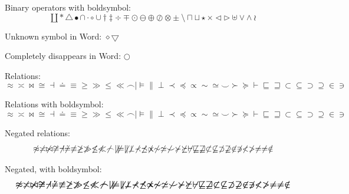 \documentclass[12pt,a4paper]{article}
\theoremstyle{clearprint}
\begin{document}
\noindent 
Binary operators with boldsymbol:
\begin{equation}
\boldsymbol{\amalg \ast \bigtriangleup \bullet \cap \cdot \circ \cup \dagger \ddagger \div \mp \odot \ominus \oplus \oslash \otimes \pm \setminus \sqcap \sqcup \star \times \triangleleft \triangleright \uplus \vee \wedge \wr}
\end{equation}

Unknown symbol in Word: $\boldsymbol{\diamond \bigtriangledown}$

Completely disappears in Word: $\boldsymbol{\bigcirc}$

\noindent 
Relations: %
\begin{equation}
\approx \asymp \bowtie \cong \dashv \doteq \equiv \geq \gg \leq \ll \frown \mid \models \parallel \perp \prec \preceq \propto \sim \simeq \smile \succ \succeq \vdash
\sqsubseteq \sqsupseteq \subset \subseteq \supset \supseteq \in \ni
\end{equation}

\noindent 
Relations with boldsymbol:
\begin{equation}
\boldsymbol{\approx \asymp \bowtie \cong \dashv \doteq \equiv \geq \gg \leq \ll \frown \mid \models \parallel \perp \prec \preceq \propto \sim \simeq \smile \succ \succeq \vdash
\sqsubseteq \sqsupseteq \subset \subseteq \supset \supseteq \in \ni
}
\end{equation}

\noindent 
Negated relations:
\begin{equation}
\not\approx \not\asymp \not\bowtie \not\cong \not\dashv \not\doteq \not\equiv \not\geq \not\gg \not\leq \not\ll \not\frown \not\mid \not\models \not\parallel \not\perp \not\prec \not\preceq \not\propto \not\sim \not\simeq \not\smile \not\succ \not\succeq \not\vdash
\not\sqsubseteq \not\sqsupseteq \not\subset \not\subseteq \not\supset \not\supseteq \not\in \not\ni
\not< \not> \not= \neq \notin
\end{equation}

\noindent 
Negated, with boldsymbol:
\begin{equation}
\boldsymbol{\not\approx \not\asymp \not\bowtie \not\cong \not\dashv \not\doteq \not\equiv \not\geq \not\gg \not\leq \not\ll \not\frown \not\mid \not\models \not\parallel \not\perp \not\prec \not\preceq \not\propto \not\sim \not\simeq \not\smile \not\succ \not\succeq \not\vdash
\not\sqsubseteq \not\sqsupseteq \not\subset \not\subseteq \not\supset \not\supseteq \not\in \not\ni
\not< \not> \not= \neq \notin}
\end{equation}
\end{document}
